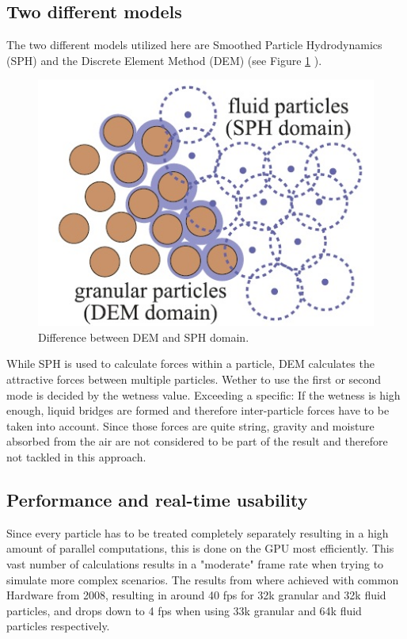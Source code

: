\subsection{Two different models}
The two different models utilized here are Smoothed Particle Hydrodynamics (SPH) \cite{rungjiratananon2008real} and the Discrete Element Method (DEM) \cite{rungjiratananon2008real} (see Figure \ref{fig:domains} ).

\begin{figure}[htb]
	\centering
	\includegraphics[width=\linewidth]{RSKN08/domains.jpg}
	\caption{Difference between DEM and SPH domain.}
	\label{fig:domains}
\end{figure}

While SPH is used to calculate forces within a particle, DEM calculates the attractive forces between multiple particles. Wether to use the first or second mode is decided by the wetness value. Exceeding a specific: If the wetness is high enough, liquid bridges are formed and therefore inter-particle forces have to be taken into account. Since those forces are quite string, gravity and moisture absorbed from the air are not considered to be part of the result and therefore not tackled in this approach.

\subsection{Performance and real-time usability}
Since every particle has to be treated completely separately resulting in a high amount of parallel computations, this is done on the GPU most efficiently. This vast number of calculations results in a "moderate" frame rate when trying to simulate more complex scenarios. The results from \cite{rungjiratananon2008real} where achieved with common Hardware from 2008, resulting in around 40 fps for 32k granular and 32k fluid particles, and drops down to 4 fps when using 33k granular and 64k fluid particles respectively.

